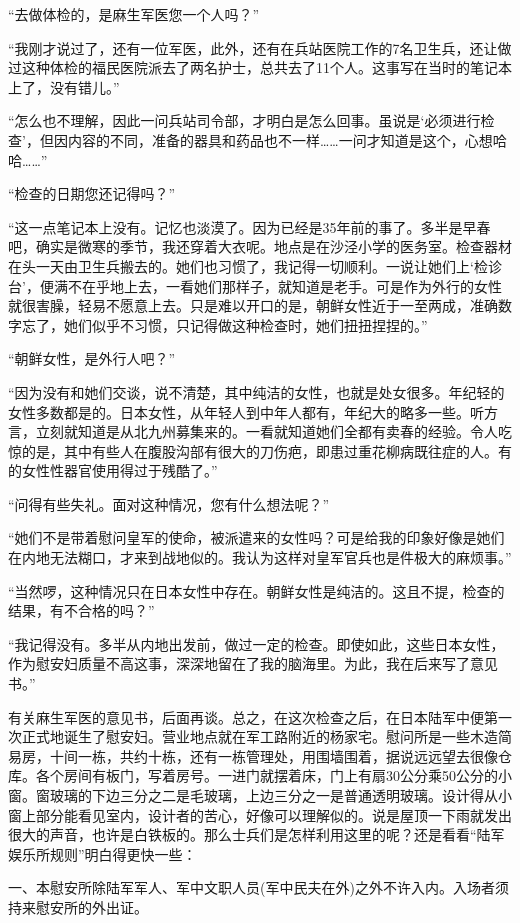 \documentclass[12pt,UTF8]{ctexbook}
\begin{document}
“去做体检的，是麻生军医您一个人吗？”

“我刚才说过了，还有一位军医，此外，还有在兵站医院工作的7名卫生兵，还让做过这种体检的福民医院派去了两名护士，总共去了11个人。这事写在当时的笔记本上了，没有错儿。”

“怎么也不理解，因此一问兵站司令部，才明白是怎么回事。虽说是‘必须进行检查’，但因内容的不同，准备的器具和药品也不一样……一问才知道是这个，心想哈哈……”

“检查的日期您还记得吗？”

“这一点笔记本上没有。记忆也淡漠了。因为已经是35年前的事了。多半是早春吧，确实是微寒的季节，我还穿着大衣呢。地点是在沙泾小学的医务室。检查器材在头一天由卫生兵搬去的。她们也习惯了，我记得一切顺利。一说让她们上‘检诊台’，便满不在乎地上去，一看她们那样子，就知道是老手。可是作为外行的女性就很害臊，轻易不愿意上去。只是难以开口的是，朝鲜女性近于一至两成，准确数字忘了，她们似乎不习惯，只记得做这种检查时，她们扭扭捏捏的。”

“朝鲜女性，是外行人吧？”

“因为没有和她们交谈，说不清楚，其中纯洁的女性，也就是处女很多。年纪轻的女性多数都是的。日本女性，从年轻人到中年人都有，年纪大的略多一些。听方言，立刻就知道是从北九州募集来的。一看就知道她们全都有卖春的经验。令人吃惊的是，其中有些人在腹股沟部有很大的刀伤疤，即患过重花柳病既往症的人。有的女性性器官使用得过于残酷了。”

“问得有些失礼。面对这种情况，您有什么想法呢？”

“她们不是带着慰问皇军的使命，被派遣来的女性吗？可是给我的印象好像是她们在内地无法糊口，才来到战地似的。我认为这样对皇军官兵也是件极大的麻烦事。”

“当然啰，这种情况只在日本女性中存在。朝鲜女性是纯洁的。这且不提，检查的结果，有不合格的吗？”

“我记得没有。多半从内地出发前，做过一定的检查。即使如此，这些日本女性，作为慰安妇质量不高这事，深深地留在了我的脑海里。为此，我在后来写了意见书。”

有关麻生军医的意见书，后面再谈。总之，在这次检查之后，在日本陆军中便第一次正式地诞生了慰安妇。营业地点就在军工路附近的杨家宅。慰问所是一些木造简易房，十间一栋，共约十栋，还有一栋管理处，用围墙围着，据说远远望去很像仓库。各个房间有板门，写着房号。一进门就摆着床，门上有扇30公分乘50公分的小窗。窗玻璃的下边三分之二是毛玻璃，上边三分之一是普通透明玻璃。设计得从小窗上部分能看见室内，设计者的苦心，好像可以理解似的。说是屋顶一下雨就发出很大的声音，也许是白铁板的。那么士兵们是怎样利用这里的呢？还是看看“陆军娱乐所规则”明白得更快一些：

一、本慰安所除陆军军人、军中文职人员(军中民夫在外)之外不许入内。入场者须持来慰安所的外出证。
\end{document}
